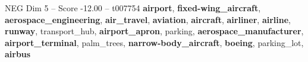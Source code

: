 \begin{textsample}{NEG Dim 5 – Score -12.00 – t007754}  \label{ex:f5_neg_034}
\textbf{airport}, \textbf{fixed-wing\_aircraft}, \textbf{aerospace\_engineering}, \textbf{air\_travel}, \textbf{aviation}, \textbf{aircraft}, \textbf{airliner}, \textbf{airline}, \textbf{runway}, transport\_hub, \textbf{airport\_apron}, parking, \textbf{aerospace\_manufacturer}, \textbf{airport\_terminal}, palm\_trees, \textbf{narrow-body\_aircraft}, \textbf{boeing}, parking\_lot, \textbf{airbus}

\end{textsample}
